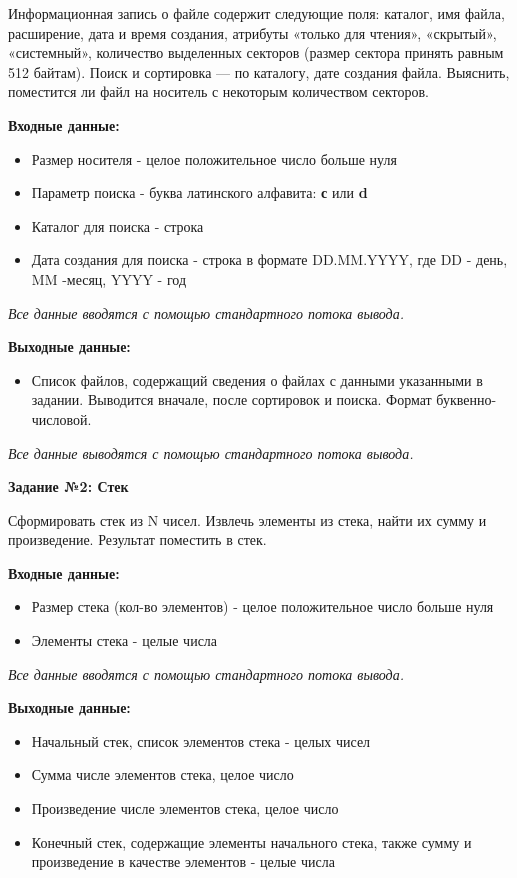 \documentclass[a4paper,12pt]{article}
\begin{document}
	Информационная запись о файле содержит следующие поля: каталог, имя файла, 
	расширение, дата и время создания, атрибуты «только для чтения», «скрытый», 
	«системный», количество выделенных секторов (размер сектора принять равным 512 
	байтам). Поиск и сортировка — по каталогу, дате создания файла. 
	Выяснить, поместится ли файл на носитель с некоторым количеством секторов.
	
	\textbf{Входные данные:}
	
	\begin{itemize}
		\item Размер носителя - целое положительное число больше нуля
		\item Параметр поиска - буква латинского алфавита: \textbf{с} или \textbf{d}
		\item Каталог для поиска - строка
		\item Дата создания для поиска - строка в формате DD.MM.YYYY, где DD - день, MM -месяц, YYYY - год 
	\end{itemize}
	\textit{Все данные вводятся с помощью стандартного потока вывода.}	

	\textbf{Выходные данные:}
	
	\begin{itemize}
		\item Список файлов, содержащий сведения о файлах с данными указанными в задании. Выводится вначале, после сортировок и поиска. Формат буквенно-числовой. 
	\end{itemize}
	
	\textit{Все данные выводятся с помощью стандартного потока вывода.}	
		
	\textbf{Задание №2: Стек}
	
	Сформировать стек из N чисел. Извлечь элементы из стека, найти их сумму и произведение. Результат поместить в стек.
	
	\textbf{Входные данные:}
	
	\begin{itemize}
		\item Размер стека (кол-во элементов) - целое положительное число больше нуля
		\item Элементы стека - целые числа
	\end{itemize}
	
	\textit{Все данные вводятся с помощью стандартного потока вывода.}		
	
	\textbf{Выходные данные:}
	
	\begin{itemize}
		\item Начальный стек, список элементов стека - целых чисел
		\item Сумма числе элементов стека, целое число
		\item Произведение числе элементов стека, целое число
		\item Конечный стек, содержащие элементы начального стека, также сумму и произведение в качестве элементов - целые числа
	\end{itemize}
	
\end{document}
